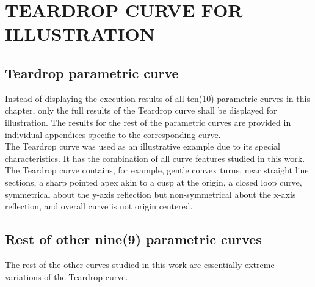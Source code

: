 \clearpage
\pagebreak
\section{TEARDROP CURVE FOR ILLUSTRATION}
\label{chap4-TEARDROP CURVE FOR ILLUSTRATION}

\subsection{Teardrop parametric curve}

Instead of displaying the execution results of all ten(10) parametric curves in this chapter, only the full results of the Teardrop curve shall be displayed for illustration. The results for the rest of the parametric curves are provided in individual appendices specific to the corresponding curve. \\

The Teardrop curve was used as an illustrative example due to its special characteristics. It has the combination of all curve features studied in this work. The Teardrop curve contains, for example, gentle convex turns, near straight line sections, a sharp pointed apex akin to a cusp at the origin, a closed loop curve, symmetrical about the y-axis reflection but non-symmetrical about the x-axis reflection, and overall curve is not origin centered.    

\subsection{Rest of other nine(9) parametric curves} 
\label{chap4-Rest of nine parametric curves} 

The rest of the other curves studied in this work are essentially extreme variations of the Teardrop curve.

